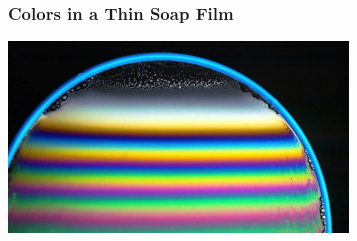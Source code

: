 \documentclass[]{beamer}
\begin{document}







  
  



  
 



 
  
  











\begin{frame}

\frametitle{Colors in a Thin Soap Film}


  
     \begin{center}
  \includegraphics[height=2.0in]{images5/soap4.jpg}
\end{center}



  \end{frame}
\end{document}
